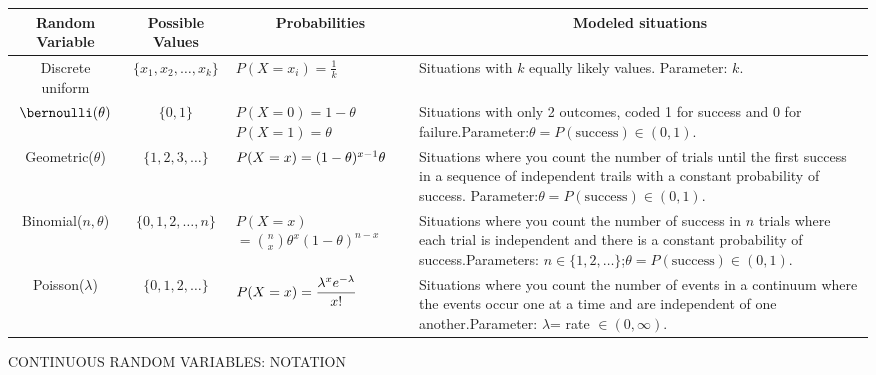 {\begin{framed}
\begin{center}
{\small
{\renewcommand{\arraystretch}{1.25}
\begin{tabular}{|c|c|p{3.0cm}|p{5.0cm}|}
\multicolumn{1}{c}{\bf Random  Variable} & \multicolumn{1}{c}{\bf Possible  Values}
&\multicolumn{1}{c}{\bf Probabilities} &\multicolumn{1}{c}{\bf Modeled situations} \\\hline
Discrete  uniform&$\{x_1,x_2,\dots,x_k\}$&$P(X=x_i)=\frac{1}{k}$&Situations with $k$ equally likely values.  Parameter: $k$.\\\hline
$\bernoulli(\theta)$&$\{0,1\}$&$P(X=0)=1-\theta$\newline$P(X=1)=\theta$&Situations with only 2 outcomes, coded 1 for success and 0 for failure.\newline Parameter:\newline $\theta=P(\textrm{success}) \in (0, 1)$.\\\hline
Geometric($\theta$)&$\{1,2,3,\dots\}$&$P(X=x)\newline=(1-\theta)^{x-1}\theta$& Situations where you count the number of trials until the first success in a sequence of independent trails with a constant probability of success. \newline Parameter:\newline $\theta=P(\textrm{success}) \in (0, 1)$.\\\hline
Binomial($n,\theta$)&$\{0,1,2,\dots,n\}$&$P(X=x)$\newline $=\displaystyle\binom{n}{x}\theta^x(1-\theta)^{n-x}$&Situations where you count the number of success in $n$ trials where each trial is independent and there is a constant probability of success.\newline Parameters: $n \in \{1,2,\ldots\}$;\newline $\theta=P(\textrm{success}) \in (0, 1)$.\\\hline
Poisson($\lambda$)&$\{0,1,2,\dots\}$&$P(X=x)\newline=\displaystyle \frac{\lambda^xe^{-\lambda}}{x!}$&Situations where you count the number of events in a continuum where the events occur one at a time and are independent of one another.\newline Parameter: $\lambda$= rate $\in (0,\infty)$.\\\hline
\end{tabular}}
}
\end{center}
\end{framed}

\begin{framed}
CONTINUOUS RANDOM VARIABLES: NOTATION\\


\end{framed}}
